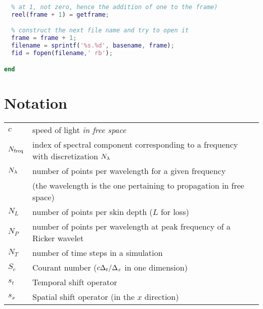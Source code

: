 \begin{program}
\begin{lstlisting}[language=Matlab]
  % capture the frame for the movie (Matlab wants index to start
  % at 1, not zero, hence the addition of one to the frame)
  reel(frame + 1) = getframe;

  % construct the next file name and try to open it
  frame = frame + 1;
  filename = sprintf('%s.%d', basename, frame);
  fid = fopen(filename,' rb');

end
\end{lstlisting}
\end{program}


\chapter{Notation}


\begin{tabular}{ll}
$c$ & speed of light {\em in free space}\\
$N_{\mbox{\scriptsize freq}}$ &
        index of spectral component corresponding to a frequency
        with discretization $N_\lambda$ \\
$N_\lambda$ & 
        number of points per wavelength for a given frequency \\
      & (the wavelength is the one pertaining to propagation in free
        space) \\
$N_L$ & number of points per skin depth ($L$ for loss)\\
$N_P$ & number of points per wavelength at peak frequency of a Ricker
        wavelet  \\
$N_T$ & number of time steps in a simulation \\
$S_c$ & Courant number ($c\Delta_t/\Delta_x$ in one dimension)\\
$s_t$ & Temporal shift operator \\
$s_x$ & Spatial shift operator (in the $x$ direction) \\
\end{tabular}
